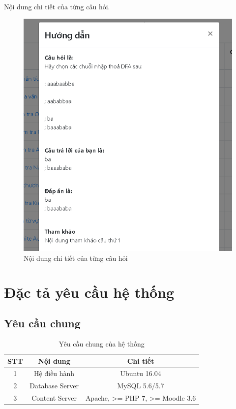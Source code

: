 \vskip 5cm
Nội dung chi tiết của từng câu hỏi.

\begin{center}
	\begin{figure}[htp]
		\begin{center}
			\includegraphics[width=1\linewidth]{img/34}
		\end{center}
		\caption{Nội dung chi tiết của từng câu hỏi}
		\label{refhinh66}
	\end{figure}
\end{center}

\newpage
\section{Đặc tả yêu cầu hệ thống}

\subsection{Yêu cầu chung}

\begin{center}
	\begin{table}[!htp]
		\centering
		\begin{tabular}{|c|c|c|}
			\hline 
			STT & Nội dung & Chi tiết \\ 
			\hline 
			1 & Hệ điều hành & Ubuntu 16.04 \\ 
			\hline 
			2 & Database Server & MySQL  5.6/5.7 \\ 
			\hline 
			3 & Content Server & Apache, >= PHP 7, >= Moodle 3.6 \\ 
			\hline 
		\end{tabular} 
		\caption{Yêu cầu chung của hệ thống}
		\label{bang20}
	\end{table}
\end{center}

